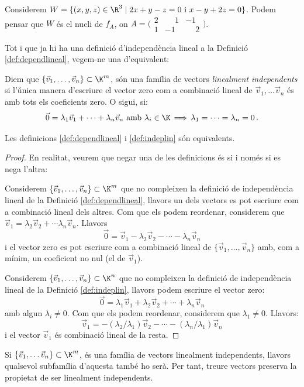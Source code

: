 \begin{exemple}
    Considerem $W=\{(x,y,z)\in\R^3 \mid 2x+y-z=0 \text{ i } x -y +2z=0\}$. Podem pensar que $W$ és el nucli de $f_A$, on $A=\big(\begin{smallmatrix} 2 & \phantom{-}1 & -1 \\ 1 & -1 & \phantom{-}2\end{smallmatrix}\big)$. 
\end{exemple}


Tot i que ja hi ha una definició d'independència lineal a la Definició \ref{def:dependlineal}, vegem-ne una d'equivalent:
\begin{definicio}\label{def:indeplin}
	Diem que $\{\vec v_1, \dots , \vec v_n\} \subset \K^m$, són una família de vectors \emph{linealment independents} si l'única manera d'escriure el vector zero com a combinació lineal de $\vec v_1, \dots \vec v_n$ és amb tots els coeficients zero. O sigui, si:
	$$
	\vec 0 = \lambda_1 \vec v_1+\cdots +\lambda_n\vec v_n \text{ amb $\lambda_i\in\K$} \, \Longrightarrow \, \lambda_1=\cdots =\lambda_n=0 \,.
	$$
\end{definicio}
\begin{observacio}
	Les definicions \ref{def:dependlineal} i \ref{def:indeplin} són equivalents.
\end{observacio}
\begin{proof} En realitat, veurem que negar una de les definicions és si i només si es nega l'altra:
	
	Considerem $\{\vec v_1, \dots , \vec v_n\} \subset \K^m$ que no compleixen la definició de independència lineal de la Definició \ref{def:dependlineal}, llavors un dels vectors es pot escriure com a combinació lineal dels altres. Com que els podem reordenar, considerem que $\vec v_1=\lambda_2\vec v_2+\cdots \lambda_n\vec v_n$. Llavors
	$$
	\vec 0 = \vec v_1- \lambda_2 \vec v_2 - \cdots -\lambda_n\vec v_n 
	$$
	i el vector zero es pot escriure com a combinació lineal de $\{\vec v_1, \dots , \vec v_n\}$ amb, com a mínim, un coeficient no nul (el de $\vec v_1$).
	
	Considerem $\{\vec v_1, \dots , \vec v_n\} \subset \K^n$ que no compleixen la definició de independència lineal de la Definició \ref{def:indeplin}, llavors podem escriure el vector zero:
	$$
	\vec 0 = \lambda_1\vec v_1+ \lambda_2 \vec v_2 + \cdots +\lambda_n\vec v_n 
	$$
	amb algun $\lambda_i\neq 0$. Com que els podem reordenar, considerem que $\lambda_1\neq 0$. Llavors:
	$$
	\vec v_1 = -(\lambda_2/\lambda_1) \vec v_2 - \cdots -(\lambda_n/\lambda_1)\vec v_n 
	$$
	i el vector $\vec v_1$ és combinació lineal de la resta.
\end{proof}
\begin{observacio}\label{obs:linindep}
	Si $\{\vec v_1, \dots \vec v_n\}\subset \K^m$, és una família de vectors linealment independents, llavors qualsevol subfamília d'aquesta també ho serà. Per tant, treure vectors preserva la propietat de ser linealment independents.
\end{observacio}

